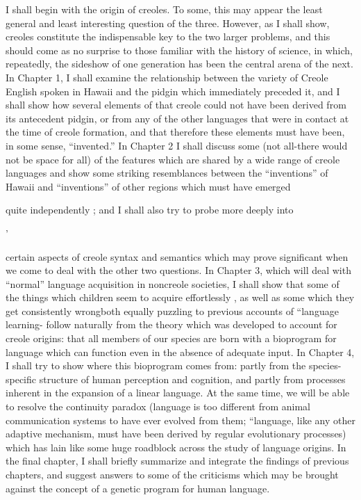 I shall begin with the origin of creoles. To some, this may appear the least general and least interesting question of the three. However, as I shall show, creoles constitute the indispensable key to the two larger problems, and this should come as no surprise to those familiar with the history of science, in which, repeatedly, the sideshow of one generation has been the central arena of the next. In Chapter 1, I shall examine the relationship between the variety of Creole English spoken in Hawaii and the pidgin which immediately preceded it, and I shall show how several elements of that creole could not have been derived from its antecedent pidgin, or from any of the other languages that were in contact at the time of creole formation, and that therefore these elements must have been, in some sense, ``invented.'' In Chap\-ter 2 I shall discuss some (not all-there would not be space for all) of the features which are shared by a wide range of creole languages and show some striking resemblances between the ``inventions'' of Hawaii and ``inventions'' of other regions which must have emerged

quite independently ; and I shall also try to probe more deeply into

'

certain aspects of creole syntax and semantics which may prove signifi\-cant when we come to deal with the other two questions. In Chapter 3, which will deal with ``normal'' language acquisition in noncreole societies, I shall show that some of the things which children seem to acquire effortlessly , as well as some which they get consistently wrong\-both equally puzzling to previous accounts of ``language learning{\textquotedbl}{}- follow naturally from the theory which was developed to account for creole origins: that all members of our species are born with a bio\-program for language which can function even in the absence of ade\-quate input. In Chapter 4, I shall try to show where this bioprogram comes from: partly from the species-specific structure of human perception and cognition, and partly from processes inherent in the expansion of a linear language. At the same time, we will be able to resolve the continuity paradox ({\textquotedbl}language is too different from animal communication systems to have ever evolved from them{\textquotedbl}; ``language, like any other adaptive mechanism, must have been derived by regular evolutionary processes{\textquotedbl}) which has lain like some huge roadblock across the study of language origins. In the final chapter, I shall briefly summarize and integrate the findings of previous chapters, and suggest answers to some of the criticisms which may be brought against the concept of a genetic program for human language.

